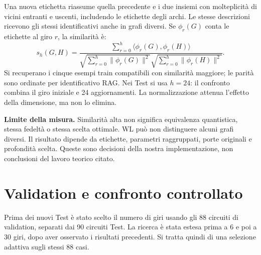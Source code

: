 \documentclass[a4paper,10pt]{article}
\begin{document}
Una nuova etichetta riassume quella precedente e i due insiemi con molteplicità
di vicini entranti e uscenti, includendo le etichette degli archi.
Le stesse descrizioni ricevono gli stessi identificativi anche in grafi diversi.
Se $\phi_r(G)$ conta le etichette al giro $r$, la similarità è:
\[
s_h(G,H)=
\frac{\sum_{r=0}^{h}\langle\phi_r(G),\phi_r(H)\rangle}
{\sqrt{\sum_{r=0}^{h}\|\phi_r(G)\|^2}
 \sqrt{\sum_{r=0}^{h}\|\phi_r(H)\|^2}}.
\]
Si recuperano i cinque esempi train compatibili con similarità maggiore;
le parità sono ordinate per identificativo RAG. Nei Test si usa $h=24$:
il confronto combina il giro iniziale e 24 aggiornamenti.
La normalizzazione attenua l'effetto della dimensione, ma non lo elimina.

\textbf{Limite della misura.} Similarità alta non significa equivalenza
quantistica, stessa fedeltà o stessa scelta ottimale. WL può non distinguere
alcuni grafi diversi. Il risultato dipende da etichette, parametri raggruppati,
porte originali e profondità scelta. Queste sono decisioni della nostra
implementazione, non conclusioni del lavoro teorico citato.

\clearpage\section{Validation e confronto controllato}
Prima dei nuovi Test è stato scelto il numero di giri usando gli 88
circuiti di validation, separati dai 90 circuiti Test.
La ricerca è stata estesa prima a 6 e poi a 30 giri, dopo aver osservato
i risultati precedenti. Si tratta quindi di una selezione adattiva sugli stessi 88 casi.
\end{document}
